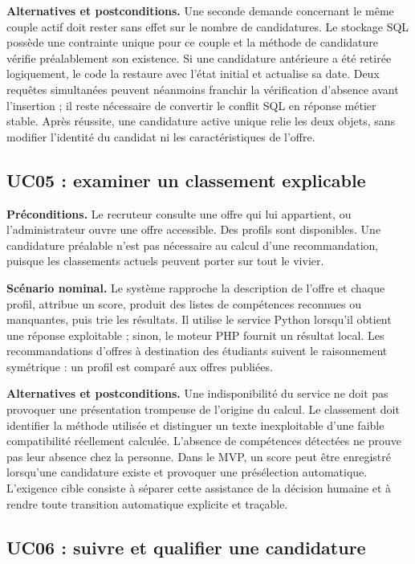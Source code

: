 \textbf{Alternatives et postconditions.} Une seconde demande concernant le même couple actif doit rester sans effet sur le nombre de candidatures. Le stockage SQL possède une contrainte unique pour ce couple et la méthode de candidature vérifie préalablement son existence. Si une candidature antérieure a été retirée logiquement, le code la restaure avec l'état initial et actualise sa date. Deux requêtes simultanées peuvent néanmoins franchir la vérification d'absence avant l'insertion ; il reste nécessaire de convertir le conflit SQL en réponse métier stable. Après réussite, une candidature active unique relie les deux objets, sans modifier l'identité du candidat ni les caractéristiques de l'offre.

\subsection{UC05 : examiner un classement explicable}

\textbf{Préconditions.} Le recruteur consulte une offre qui lui appartient, ou l'administrateur ouvre une offre accessible. Des profils sont disponibles. Une candidature préalable n'est pas nécessaire au calcul d'une recommandation, puisque les classements actuels peuvent porter sur tout le vivier.

\textbf{Scénario nominal.} Le système rapproche la description de l'offre et chaque profil, attribue un score, produit des listes de compétences reconnues ou manquantes, puis trie les résultats. Il utilise le service Python lorsqu'il obtient une réponse exploitable ; sinon, le moteur PHP fournit un résultat local. Les recommandations d'offres à destination des étudiants suivent le raisonnement symétrique : un profil est comparé aux offres publiées.

\textbf{Alternatives et postconditions.} Une indisponibilité du service ne doit pas provoquer une présentation trompeuse de l'origine du calcul. Le classement doit identifier la méthode utilisée et distinguer un texte inexploitable d'une faible compatibilité réellement calculée. L'absence de compétences détectées ne prouve pas leur absence chez la personne. Dans le MVP, un score peut être enregistré lorsqu'une candidature existe et provoquer une présélection automatique. L'exigence cible consiste à séparer cette assistance de la décision humaine et à rendre toute transition automatique explicite et traçable.

\subsection{UC06 : suivre et qualifier une candidature}

